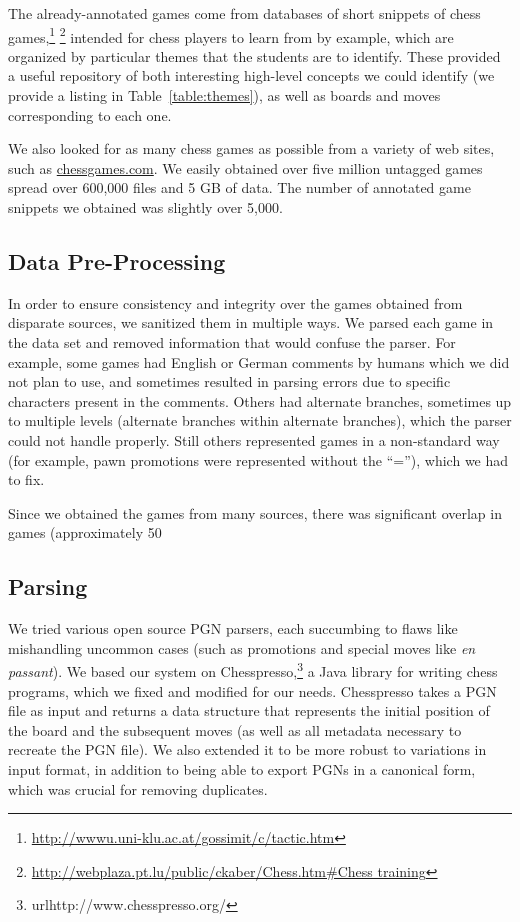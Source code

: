 \documentclass[11pt]{article}
\begin{document}
The already-annotated games come from databases of short snippets of chess games,\footnote{\url{http://wwwu.uni-klu.ac.at/gossimit/c/tactic.htm}} \footnote{\url{http://webplaza.pt.lu/public/ckaber/Chess.htm#Chess training}} intended for chess players to learn from by example, which are organized by particular themes that the students are to identify. These provided a useful repository of both interesting high-level concepts we could identify (we provide a listing in Table~\ref{table:themes}), as well as boards and moves corresponding to each one.

We also looked for as many chess games as possible from a variety of web sites, such as \url{chessgames.com}. We easily obtained over five million untagged games spread over 600,000 files and 5 GB of data. The number of annotated game snippets we obtained was slightly over 5,000.

\subsection{Data Pre-Processing}	
In order to ensure consistency and integrity over the games obtained from disparate sources, we sanitized them in multiple ways. We parsed each game in the data set and removed information that would confuse the parser. For example, some games had English or German comments by humans which we did not plan to use, and sometimes resulted in parsing errors due to specific characters present in the comments. Others had alternate branches, sometimes up to multiple levels (alternate branches within alternate branches), which the parser could not handle properly. Still others represented games in a non-standard way (for example, pawn promotions were represented without the ``=''), which we had to fix. 

Since we obtained the games from many sources, there was significant overlap in games (approximately 50%

\subsection{Parsing}
We tried various open source PGN parsers, each succumbing to flaws like mishandling uncommon cases (such as  promotions and special moves like \emph{en passant}). We based our system on Chesspresso,\footnote{url{http://www.chesspresso.org/}} a Java library for writing chess programs, which we fixed and modified for our needs. Chesspresso takes a PGN file as input and returns a data structure that represents the initial position of the board and the subsequent moves (as well as all metadata necessary to recreate the PGN file). We also extended it to be more robust to variations in input format, in addition to being able to export PGNs in a canonical form, which was crucial for removing duplicates.
\end{document}
